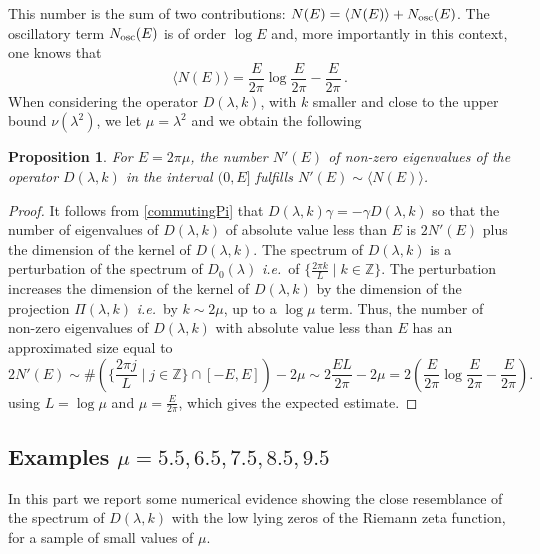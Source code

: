 \documentclass[cupthm]{CUP-JNL-JMJ}
\def\Z{{\mathbb Z}}
\newcommand{\ie}{{\it i.e.\/}\ }
\numberwithin{equation}{section}
\theoremstyle{cupplain}
\newtheorem{proposition}[theorem]{Proposition}
\theoremstyle{cupdefinition}
\theoremstyle{cupremark}
\theoremstyle{cupproof}
\newtheorem{proof}{Proof}
\begin{document}
This number is the sum of two contributions: $N(E)=\langle N(E)\rangle + N_{\rm osc}(E)$. The oscillatory term $N_{\rm osc}(E)$ is of  order  $\log E$ and,  more importantly in this context, one knows that
\begin{equation}\label{nerough}
\langle N(E)\rangle =
 \frac{E}{2\pi}\log \frac{E}{2\pi} - \frac{E}{2\pi}\,.
 \end{equation}
 When considering the operator $D(\lambda,k)$, with $k$ smaller and close to the upper bound $\nu(\lambda^2)$, we let $\mu=\lambda^2$ and we obtain the following 
 \begin{proposition}\label{propDpert1} For  $E=2 \pi \mu$, the number $N'(E)$ of non-zero eigenvalues of the operator $D(\lambda,k)$  in the interval $(0,E]$ fulfills $N'(E)\sim \langle N(E)\rangle$.
\end{proposition}
\begin{proof} It follows from \eqref{commutingPi} that $D(\lambda,k)\gamma=-\gamma D(\lambda,k)$ so that the number of eigenvalues  of $D(\lambda,k)$ of absolute value less than $E$ is $2 N'(E)$ plus the dimension of the kernel of $D(\lambda,k)$. The spectrum of $D(\lambda,k)$   is a perturbation of the spectrum of $D_0(\lambda)$ \ie of  $\{\frac{2 \pi  k}{L}\mid k\in \Z\}$. The perturbation increases the dimension of the kernel of $D(\lambda,k)$  by the dimension of the projection $\Pi(\lambda,k)$ \ie by $k\sim 2 \mu$, up to a $\log \mu$ term.  Thus, the number of non-zero eigenvalues of $D(\lambda,k)$ with absolute value less than $E$ has an approximated size equal to
$$
2 N'(E)\sim \#\left(\Big\{\frac{2 \pi  j}{L}\mid j\in \Z{\Big\}}\cap [-E,E]\right)-2 \mu\sim 2\frac{E L}{2 \pi }-2\mu=2\left(\frac{E}{2\pi}\log \frac{E}{2\pi} - \frac{E}{2\pi}\right).
$$
using $L=\log \mu$ and $\mu= \frac{E}{2\pi}$, which gives the expected estimate.
\end{proof} 

 \subsection{Examples $\mu=5.5, 6.5,7.5,8.5, 9.5$}
In this part we report some numerical evidence showing the close resemblance of the spectrum of $D(\lambda,k)$ with the low lying zeros of the Riemann zeta function, for a sample of small values of $\mu$.
\end{document}
